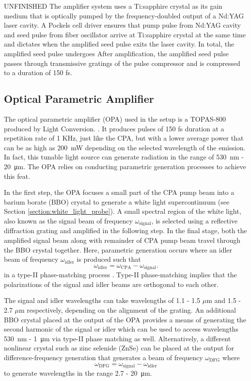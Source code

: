 {\color{red} UNFINISHED} The amplifier system uses a Ti:sapphire crystal as its gain medium that is optically pumped by the frequency-doubled output of a Nd:YAG laser cavity. A Pockels cell driver ensures that pump pulse from Nd:YAG cavity and seed pulse from fiber oscillator arrive at Ti:sapphire crystal at the same time and dictates when the amplified seed pulse exits the laser cavity. In total, the amplified seed pulse undergoes  After amplification, the amplified seed pulse passes through transmissive gratings of the pulse compressor and is compressed to a duration of 150 fs. 

\subsection{Optical Parametric Amplifier}
\label{section:opa}

The optical parametric amplifier (OPA) used in the setup is a TOPAS-800 produced by Light Conversion. \cite{topas}. It produces pulses of 150 fs duration at a repetition rate of 1 KHz, just like the CPA, but with a lower average power that can be as high as \SI{200}{\milli\watt} depending on the selected wavelength of the emission. In fact, this tunable light source can generate radiation in the range of \SI{530}{\nano\meter} - \SI{20}{\micro\meter}. The OPA relies on conducting parametric generation processes to achieve this feat. 

In the first step, the OPA focuses a small part of the CPA pump beam into a barium borate (BBO) crystal to generate a white light supercontinuum (see Section \ref{section:white_light_probe}). A small spectral region of the white light, also known as the signal beam of frequency $\omega_\text{signal}$, is selected using a reflective diffraction grating and amplified in the following step. In the final stage, both the amplified signal beam along with remainder of CPA pump beam travel through the BBO crystal together. Here, parametric generation occurs where an idler beam of frequency $\omega_\text{idler}$ is produced such that
\begin{equation}
	\omega_\text{idler} = \omega_\text{CPA} - \omega_\text{signal}.
\end{equation}
in a type-II phase-matching process \cite{dunn1999parametric}. Type-II phase-matching implies that the polarizations of the signal and idler beams are orthogonal to each other.

The signal and idler wavelengths can take wavelengths of 1.1 - 1.5 $\mu$m  and 1.5 - 2.7 $\mu$m respectively, depending on the alignment of the grating. An additional BBO crystal placed at the output of the OPA provides a means of generating the second harmonic of the signal or idler which can be used to access wavelengths \SI{530}{nm} - \SI{1}{\micro \meter} via type-II phase matching as well. Alternatively, a different nonlinear crystal such as zinc selenide (ZnSe) can be placed at the output for difference-frequency generation that generates a beam of frequency $\omega_\text{DFG}$ where
\begin{equation}
	\omega_\text{DFG} = \omega_\text{signal} - \omega_\text{idler}
\end{equation}
to generate wavelengths in the range 2.7 - \SI{20}{\micro\meter}.
